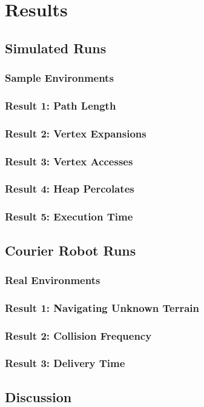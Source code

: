 \chapter{Results}


\section{Simulated Runs}

\subsection{Sample Environments}

\subsection{Result 1: Path Length}

\subsection{Result 2: Vertex Expansions}

\subsection{Result 3: Vertex Accesses}

\subsection{Result 4: Heap Percolates}

\subsection{Result 5: Execution Time}


\section{Courier Robot Runs}

\subsection{Real Environments}

\subsection{Result 1: Navigating Unknown Terrain}

\subsection{Result 2: Collision Frequency}

\subsection{Result 3: Delivery Time}

\section{Discussion}
